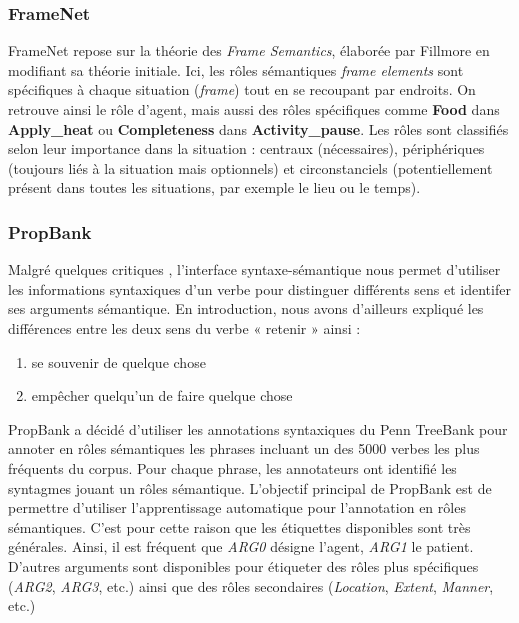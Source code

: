 \subsubsection{FrameNet}

FrameNet repose sur la théorie des \textit{Frame Semantics}, élaborée par
Fillmore en modifiant sa théorie initiale. Ici, les rôles sémantiques
\textit{frame elements} sont spécifiques à chaque situation (\textit{frame})
tout en se recoupant par endroits. On retrouve ainsi le rôle d'agent, mais
aussi des rôles spécifiques comme \textbf{Food} dans \textbf{Apply\_heat} ou
\textbf{Completeness} dans \textbf{Activity\_pause}. Les rôles sont classifiés
selon leur importance dans la situation : centraux (nécessaires), périphériques
(toujours liés à la situation mais optionnels) et circonstanciels
(potentiellement présent dans toutes les situations, par exemple le lieu ou le
temps).

\subsubsection{PropBank}

Malgré quelques critiques \citep{riemer2011conception}, l'interface
syntaxe-sémantique nous permet d'utiliser les informations syntaxiques d'un
verbe pour distinguer différents sens et identifer ses arguments sémantique. En
introduction, nous avons d'ailleurs expliqué les différences entre les deux
sens du verbe « retenir » ainsi :

\begin{enumerate}
    \item se souvenir de quelque chose
    \item empêcher quelqu'un de faire quelque chose
\end{enumerate}

PropBank \citep{palmer2005proposition} a décidé d'utiliser les annotations
syntaxiques du Penn TreeBank \citep{marcus1993building} pour annoter en rôles
sémantiques les phrases incluant un des 5000 verbes les plus fréquents du
corpus. Pour chaque phrase, les annotateurs ont identifié les syntagmes jouant
un rôles sémantique. L'objectif principal de PropBank est de permettre
d'utiliser l'apprentissage automatique pour l'annotation en rôles sémantiques.
C'est pour cette raison que les étiquettes disponibles sont très générales.
Ainsi, il est fréquent que \textit{ARG0} désigne l'agent, \textit{ARG1} le
patient. D'autres arguments sont disponibles pour étiqueter des rôles plus
spécifiques (\textit{ARG2}, \textit{ARG3}, etc.) ainsi que des rôles
secondaires (\textit{Location}, \textit{Extent}, \textit{Manner}, etc.)

